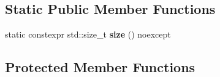 \subsection*{Static Public Member Functions}
\begin{DoxyCompactItemize}
\item 
\mbox{\label{classsequoia_1_1maths_1_1graph__impl_1_1static__node__storage_3_01_weight_proxy_00_01_n_00_01true_01_4_a2be9639a09d69e14081fa466f8760e4b}} 
static constexpr std\+::size\+\_\+t {\bfseries size} () noexcept
\end{DoxyCompactItemize}
\subsection*{Protected Member Functions}
